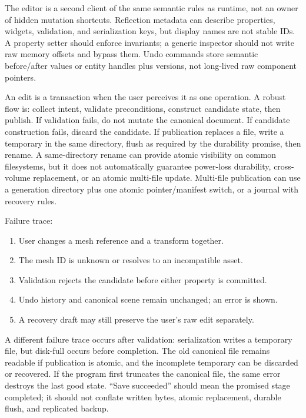 The editor is a second client of the same semantic rules as runtime, not an owner of hidden mutation shortcuts. Reflection metadata can describe properties, widgets, validation, and serialization keys, but display names are not stable IDs. A property setter should enforce invariants; a generic inspector should not write raw memory offsets and bypass them. Undo commands store semantic before/after values or entity handles plus versions, not long-lived raw component pointers.

An edit is a transaction when the user perceives it as one operation. A robust flow is: collect intent, validate preconditions, construct candidate state, then publish. If validation fails, do not mutate the canonical document. If candidate construction fails, discard the candidate. If publication replaces a file, write a temporary in the same directory, flush as required by the durability promise, then rename. A same-directory rename can provide atomic visibility on common filesystems, but it does not automatically guarantee power-loss durability, cross-volume replacement, or an atomic multi-file update. Multi-file publication can use a generation directory plus one atomic pointer/manifest switch, or a journal with recovery rules.

Failure trace:

\begin{enumerate}
\def\labelenumi{\arabic{enumi}.}
\tightlist
\item
  User changes a mesh reference and a transform together.
\item
  The mesh ID is unknown or resolves to an incompatible asset.
\item
  Validation rejects the candidate before either property is committed.
\item
  Undo history and canonical scene remain unchanged; an error is shown.
\item
  A recovery draft may still preserve the user's raw edit separately.
\end{enumerate}

A different failure trace occurs after validation: serialization writes a temporary file, but disk-full occurs before completion. The old canonical file remains readable if publication is atomic, and the incomplete temporary can be discarded or recovered. If the program first truncates the canonical file, the same error destroys the last good state. ``Save succeeded'' should mean the promised stage completed; it should not conflate written bytes, atomic replacement, durable flush, and replicated backup.

